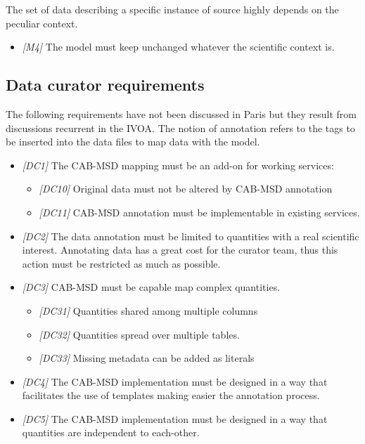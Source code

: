 \documentclass[11pt,a4paper]{ivoa}
\begin{document}
The set of data describing a specific instance of source highly depends on the peculiar context.
\begin{itemize}
    \item \textit{[M4]} The model must keep unchanged whatever the scientific context is.
\end{itemize}


\subsection{Data curator requirements}
The following requirements have not been discussed in Paris but they result from discussions recurrent in the IVOA.
The notion of annotation refers to the tags to be inserted into the data files to map data with the model.
\begin{itemize}
    \item \textit{[DC1]} The CAB-MSD mapping must be an add-on for working services:
    \begin{itemize}
        \item \textit{[DC10]} Original data must not be altered by CAB-MSD annotation
        \item \textit{[DC11]} CAB-MSD annotation must be implementable in existing services.
    \end{itemize}
\end{itemize}
\begin{itemize}
    \item \textit{[DC2]} The data annotation must be limited to quantities with a real scientific interest. Annotating data has a great cost for the curator team, thus this action must be restricted as much as possible.
\end{itemize}
\begin{itemize}
    \item \textit{[DC3]} CAB-MSD must be capable map complex quantities.
    \begin{itemize}
        \item \textit{[DC31]} Quantities shared among multiple columns
        \item \textit{[DC32]} Quantities spread over multiple tables.
        \item \textit{[DC33]} Missing metadata can be added as literals
    \end{itemize}
\end{itemize}
\begin{itemize}
    \item \textit{[DC4]} The CAB-MSD implementation must be designed in a way that facilitates the use of templates making easier the annotation process.
    \item \textit{[DC5]} The CAB-MSD implementation must be designed in a way that quantities are independent to each-other.
\end{itemize}
\end{document}
